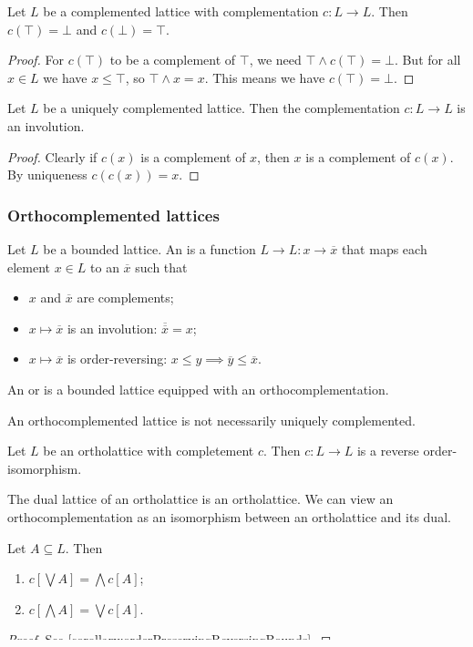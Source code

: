 \begin{lemma}
Let $L$ be a complemented lattice with complementation $c:L\to L$. Then $c(\top) = \bot$ and $c(\bot) = \top$.
\end{lemma}
\begin{proof}
For $c(\top)$ to be a complement of $\top$, we need $\top \wedge c(\top) = \bot$. But for all $x\in L$ we have $x\leq \top$, so $\top\wedge x = x$. This means we have $c(\top) = \bot$.
\end{proof}

\begin{lemma} \label{lemma:uniqueComplementInvolution}
Let $L$ be a uniquely complemented lattice. Then the complementation $c:L\to L$ is an involution.
\end{lemma}
\begin{proof}
Clearly if $c(x)$ is a complement of $x$, then $x$ is a complement of $c(x)$. By uniqueness $c(c(x)) = x$.
\end{proof}

\subsubsection{Orthocomplemented lattices}
\begin{definition}
Let $L$ be a bounded lattice. An  is a function $L \to L: x \to \overline{x}$ that maps each element $x\in L$ to an  $\overline{x}$ such that
\begin{itemize}
\item $x$ and $\overline{x}$ are complements;
\item $x\mapsto \overline{x}$ is an involution: $\overline{\overline{x}} = x$;
\item $x\mapsto \overline{x}$ is order-reversing: $x\leq y \implies \overline{y} \leq \overline{x}$.
\end{itemize}
An  or  is a bounded lattice equipped with an orthocomplementation.
\end{definition}
An orthocomplemented lattice is not necessarily uniquely complemented.

\begin{lemma}
Let $L$ be an ortholattice with completement $c$. Then $c: L \to L$ is a reverse order-isomorphism.
\end{lemma}
\begin{corollary}
The dual lattice of an ortholattice is an ortholattice. We can view an orthocomplementation as an isomorphism between an ortholattice and its dual.
\end{corollary}
\begin{corollary}
Let $A\subseteq L$. Then
\begin{enumerate}
\item $c\left[\bigvee A\right] = \bigwedge c[A]$;
\item $c\left[\bigwedge A\right] = \bigvee c[A]$.
\end{enumerate}
\end{corollary}
\begin{proof}
See \ref{corollary:orderPreservingReversingBounds}.
\end{proof}

